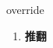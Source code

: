 
\begin{frame}
{\huge override}
\begin{center}
\begin{enumerate}\Large
  \item \textbf{推翻}
\end{enumerate}
\end{center}
\end{frame}
